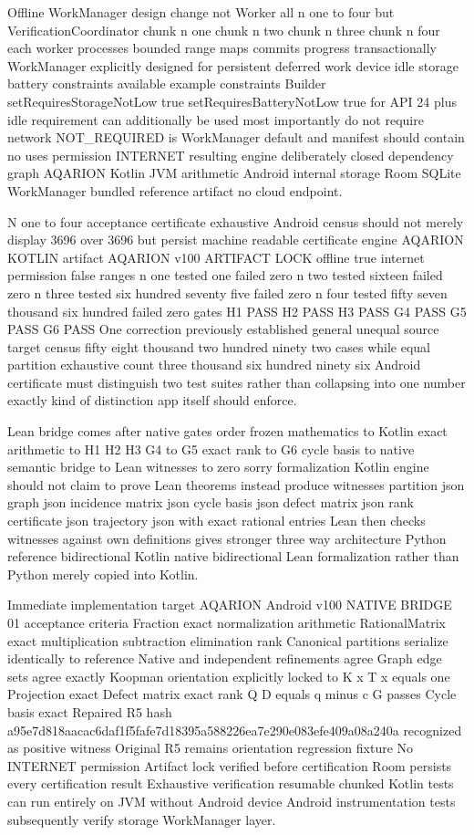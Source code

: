 Offline WorkManager design change not Worker all n one to four but VerificationCoordinator chunk n one chunk n two chunk n three chunk n four each worker processes bounded range maps commits progress transactionally WorkManager explicitly designed for persistent deferred work device idle storage battery constraints available example constraints Builder setRequiresStorageNotLow true setRequiresBatteryNotLow true for API 24 plus idle requirement can additionally be used most importantly do not require network NOT_REQUIRED is WorkManager default and manifest should contain no uses permission INTERNET resulting engine deliberately closed dependency graph AQARION Kotlin JVM arithmetic Android internal storage Room SQLite WorkManager bundled reference artifact no cloud endpoint.

N one to four acceptance certificate exhaustive Android census should not merely display 3696 over 3696 but persist machine readable certificate engine AQARION KOTLIN artifact AQARION v100 ARTIFACT LOCK offline true internet permission false ranges n one tested one failed zero n two tested sixteen failed zero n three tested six hundred seventy five failed zero n four tested fifty seven thousand six hundred failed zero gates H1 PASS H2 PASS H3 PASS G4 PASS G5 PASS G6 PASS One correction previously established general unequal source target census fifty eight thousand two hundred ninety two cases while equal partition exhaustive count three thousand six hundred ninety six Android certificate must distinguish two test suites rather than collapsing into one number exactly kind of distinction app itself should enforce.

Lean bridge comes after native gates order frozen mathematics to Kotlin exact arithmetic to H1 H2 H3 G4 to G5 exact rank to G6 cycle basis to native semantic bridge to Lean witnesses to zero sorry formalization Kotlin engine should not claim to prove Lean theorems instead produce witnesses partition json graph json incidence matrix json cycle basis json defect matrix json rank certificate json trajectory json with exact rational entries Lean then checks witnesses against own definitions gives stronger three way architecture Python reference bidirectional Kotlin native bidirectional Lean formalization rather than Python merely copied into Kotlin.

Immediate implementation target AQARION Android v100 NATIVE BRIDGE 01 acceptance criteria Fraction exact normalization arithmetic RationalMatrix exact multiplication subtraction elimination rank Canonical partitions serialize identically to reference Native and independent refinements agree Graph edge sets agree exactly Koopman orientation explicitly locked to K x T x equals one Projection exact Defect matrix exact rank Q D equals q minus c G passes Cycle basis exact Repaired R5 hash a95e7d818aacac6daf1f5fafe7d18395a588226ea7e290e083efe409a08a240a recognized as positive witness Original R5 remains orientation regression fixture No INTERNET permission Artifact lock verified before certification Room persists every certification result Exhaustive verification resumable chunked Kotlin tests can run entirely on JVM without Android device Android instrumentation tests subsequently verify storage WorkManager layer.

